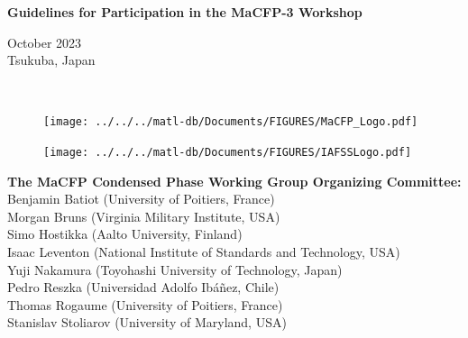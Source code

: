 \documentclass[12pt,demo]{article}
\begin{document}

\thispagestyle{empty}


\vspace*{0.75in}

\begin{center}
\begin{Large}
{\bf Guidelines for Participation in the MaCFP-3 Workshop} \\
\end{Large}
\begin{large}
October 2023\\
Tsukuba, Japan
\end{large}
\hspace{1in} \\
\end{center}


\begin{figure}[h]
  \centering
  \texttt{[image: ../../../matl-db/Documents/FIGURES/MaCFP\_Logo.pdf]}
  \label{Cover_Image}
\end{figure}

\vfill

\begin{minipage}{0.25\textwidth}
\begin{figure}[H]
\texttt{[image: ../../../matl-db/Documents/FIGURES/IAFSSLogo.pdf]}
\end{figure}
\end{minipage} \hfill
\begin{minipage}{0.75\textwidth}
\begin{flushright}
\begin{small}
{\bf The MaCFP Condensed Phase Working Group Organizing Committee:} \\
Benjamin Batiot (University of Poitiers, France) \\
Morgan Bruns (Virginia Military Institute, USA) \\
Simo Hostikka (Aalto University, Finland) \\
Isaac Leventon (National Institute of Standards and Technology, USA) \\
Yuji Nakamura (Toyohashi University of Technology, Japan) \\
Pedro Reszka (Universidad Adolfo Ibáñez, Chile) \\
Thomas Rogaume (University of Poitiers, France) \\
Stanislav Stoliarov (University of Maryland, USA)
\end{small}
\end{flushright}
\end{minipage}
\end{document}

